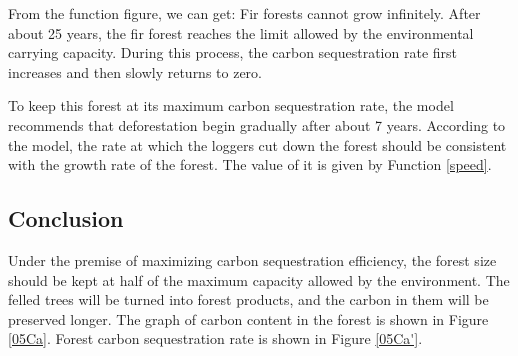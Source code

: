 \documentclass[12pt]{article}
\begin{document}
From the function figure, we can get: Fir forests cannot grow infinitely. After
about 25 years, the fir forest reaches the limit allowed by the environmental
carrying capacity. During this process, the carbon sequestration rate first
increases and then slowly returns to zero.

To keep this forest at its maximum carbon sequestration rate, the model
recommends that deforestation begin gradually after about 7 years. According to
the model, the rate at which the loggers cut down the forest should be
consistent with the growth rate of the forest. The value of it is given by
Function \ref{speed}.
\subsection{Conclusion}
Under the premise of maximizing carbon sequestration efficiency, the forest
size should be kept at half of the maximum capacity allowed by the environment.
The felled trees will be turned into forest products, and the carbon in them
will be preserved longer. The graph of carbon content in the forest is shown in
Figure \ref{05Ca}. Forest carbon sequestration rate is shown in Figure
\ref{05Ca'}.
\end{document}
